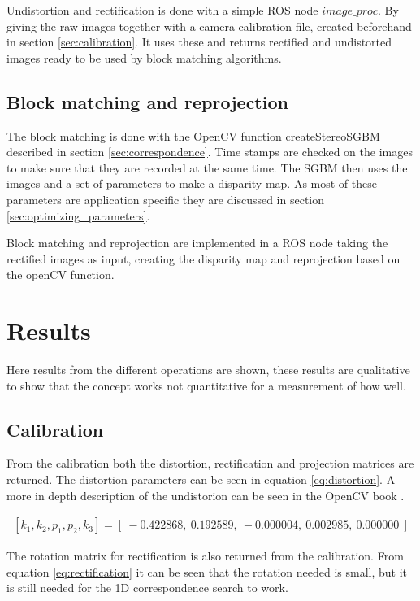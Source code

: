 Undistortion and rectification is done with a simple ROS node $image\_proc$. By giving the raw images together with a camera calibration file, created beforehand in section \ref{sec:calibration}. It uses these and returns rectified and undistorted images ready to be used by block matching algorithms.

\subsection{Block matching and reprojection}

The block matching is done with the OpenCV function createStereoSGBM \cite{opencv} described in section \ref{sec:correspondence}. Time stamps are checked on the images to make sure that they are recorded at the same time. The SGBM then uses the images and a set of parameters to make a disparity map. As most of these parameters are application specific they are discussed in section \ref{sec:optimizing_parameters}. 

Block matching and reprojection are implemented in a ROS node taking the rectified images as input, creating the disparity map and reprojection based on the openCV function.
 
\section{Results}
Here results from the different operations are shown, these results are qualitative to show that the concept works not quantitative for a measurement of how well.

\subsection{Calibration}
From the calibration both the distortion, rectification and projection matrices are returned. The distortion parameters can be seen in equation \ref{eq:distortion}. A more in depth description of the undistorion can be seen in the OpenCV book \cite{locv}.

\begin{equation}\label{eq:distortion}
\begin{split}
[ k_{1}, k_{2}, p_{1}, p_{2}, k_{3} ] = [\ -0.422868,\ 0.192589,\ -0.000004,\ 0.002985,\ 0.000000\ ]
\end{split}
\end{equation} 

The rotation matrix for rectification is also returned from the calibration. From equation \ref{eq:rectification} it can be seen that the rotation needed is small, but it is still needed for the 1D correspondence search to work. 

